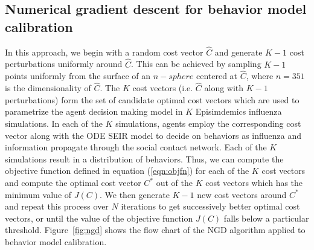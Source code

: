 \documentclass[doublespace]{VTthesis}
\begin{document}
    \subsection{Numerical gradient descent for behavior model calibration} 
    In this approach, we begin with a random cost vector $\hat{C}$ and generate $K-1$ cost perturbations uniformly around $\hat{C}$. This can be achieved by sampling $K-1$ points uniformly from the surface of an $n-sphere$ centered at $\hat{C}$, where $n = 351$ is the dimensionality of $\hat{C}$. The $K$ cost vectors (i.e. $\hat{C}$ along with $K-1$ perturbations) form the set of candidate optimal cost vectors which are used to parametrize the agent decision making model in $K$ Episimdemics influenza simulations. In each of the $K$ simulations, agents employ the corresponding cost vector along with the ODE SEIR model to decide on behaviors as influenza and information propagate through the social contact network. Each of the $K$ simulations result in a distribution of behaviors. Thus, we can compute the objective function defined in equation (\ref{eqn:objfn}) for each of the $K$ cost vectors and compute the optimal cost vector $C^*$ out of the $K$ cost vectors which has the minimum value of $J(C)$. We then generate $K-1$ new cost vectors around $C^*$ and repeat this process over $N$ iterations to get successively better optimal cost vectors, or until the value of the objective function $J(C)$ falls below a particular threshold. Figure~\ref{fig:ngd} shows the flow chart of the NGD algorithm applied to behavior model calibration.
    
\end{document}
